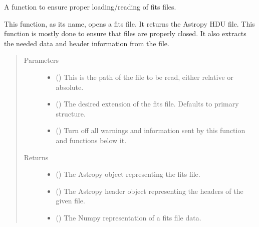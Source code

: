\documentclass[letterpaper,10pt,english]{sphinxmanual}
\begin{document}
\begin{fulllineitems}
\label{\detokenize{docstrings/ifa_smeargle.core.io:ifa_smeargle.core.io.read_fits_file}}
A function to ensure proper loading/reading of fits files.

This function, as its name, opens a fits file. It returns the
Astropy HDU file. This function is mostly done to ensure that
files are properly closed. It also extracts the needed data
and header information from the file.
\begin{quote}\begin{description}
\item[{Parameters}] \leavevmode\begin{itemize}
\item {} 
 () \textendash{} This is the path of the file to be read, either relative
or absolute.

\item {} 
 (\sphinxstyleliteralemphasis{\sphinxupquote{ (}}\sphinxstyleliteralemphasis{\sphinxupquote{)}}) \textendash{} The desired extension of the fits file. Defaults to primary
structure.

\item {} 
 (\sphinxstyleliteralemphasis{\sphinxupquote{ (}}\sphinxstyleliteralemphasis{\sphinxupquote{)}}) \textendash{} Turn off all warnings and information sent by this function
and functions below it.

\end{itemize}

\item[{Returns}] \leavevmode
\begin{itemize}
\item {} 
 () \textendash{} The Astropy object representing the fits file.

\item {} 
 () \textendash{} The Astropy header object representing the headers of the
given file.

\item {} 
 () \textendash{} The Numpy representation of a fits file data.

\end{itemize}


\end{description}\end{quote}

\end{fulllineitems}
\end{document}
